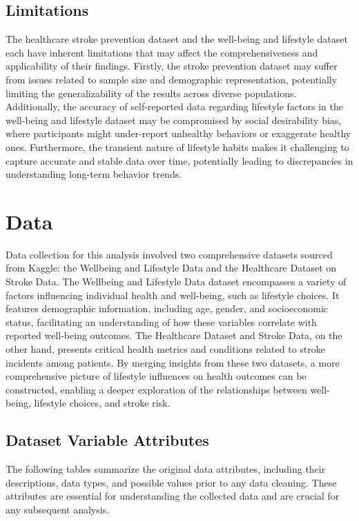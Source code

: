\documentclass[runningheads]{llncs}
\begin{document}
\begin{enumerate}
\subsection{Limitations}
The healthcare stroke prevention dataset and the well-being and lifestyle dataset each have inherent limitations that may affect the comprehensiveness and applicability of their findings. Firstly, the stroke prevention dataset may suffer from issues related to sample size and demographic representation, potentially limiting the generalizability of the results across diverse populations. Additionally, the accuracy of self-reported data regarding lifestyle factors in the well-being and lifestyle dataset may be compromised by social desirability bias, where participants might under-report unhealthy behaviors or exaggerate healthy ones. Furthermore, the transient nature of lifestyle habits makes it challenging to capture accurate and stable data over time, potentially leading to discrepancies in understanding long-term behavior trends.

\section{Data}
Data collection for this analysis involved two comprehensive datasets sourced from Kaggle: the Wellbeing and Lifestyle Data and the Healthcare Dataset on Stroke Data. The Wellbeing and Lifestyle Data dataset encompasses a variety of factors influencing individual health and well-being, such as lifestyle choices. It features demographic information, including age, gender, and socioeconomic status, facilitating an understanding of how these variables correlate with reported well-being outcomes. The Healthcare Dataset and Stroke Data, on the other hand, presents critical health metrics and conditions related to stroke incidents among patients. By merging insights from these two datasets, a more comprehensive picture of lifestyle influences on health outcomes can be constructed, enabling a deeper exploration of the relationships between well-being, lifestyle choices, and stroke risk.


\subsection{Dataset Variable Attributes}

The following tables summarize the original data attributes, including their descriptions, data types, and possible values prior to any data cleaning. These attributes are essential for understanding the collected data and are crucial for any subsequent analysis.


\end{enumerate}
\end{document}
